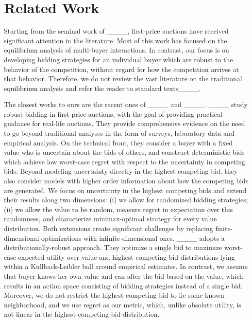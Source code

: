 \section{Related Work}
Starting from the seminal work of ____, first-price auctions have received significant attention in the literature. Most of this work has focused on the equilibrium analysis of multi-buyer interactions. In contrast, our focus is on developing bidding strategies for an individual buyer which are robust to the behavior of the competition, without regard for how the competition arrives at that behavior. Therefore, we do not review the vast literature on the traditional equilibrium analysis and refer the reader to standard texts____.

The closest works to ours are the recent ones of ____ and ____. ____ study robust bidding in first-price auctions, with the goal of providing practical guidance for real-life auctions. They provide comprehensive evidence on the need to go beyond traditional analyses in the form of surveys, laboratory data and empirical analysis. On the technical front, they consider a buyer with a fixed value who is uncertain about the bids of others, and construct deterministic bids which achieve low worst-case regret with respect to the uncertainty in competing bids. Beyond modeling uncertainty directly in the highest competing bid, they also consider models with higher order information about how the competing bids are generated. We focus on uncertainty in the highest competing bids and extend their results along two dimensions: (i) we allow for randomized bidding strategies; (ii) we allow the value to be random, measure regret in expectation over this randomness, and characterize minimax-optimal strategy for every value distribution. Both extensions create significant challenges by replacing finite-dimensional optimizations with infinite-dimensional ones. ____ adopts a distributionally-robust approach. They optimize a single bid to maximize worst-case expected utility over value and highest-competing-bid distributions lying within a Kullback-Leibler ball around empirical estimates. In contrast, we assume that buyer knows her own value and can alter the bid based on the value, which results in an action space consisting of bidding strategies instead of a single bid. Moreover, we do not restrict the highest-competing-bid to lie some known neighborhood, and we use regret as our metric, which, unlike absolute utility, is not linear in the highest-competing-bid distribution.

